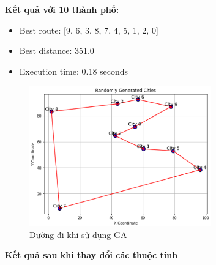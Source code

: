 \documentclass[14pt]{article}
\begin{document}
	\newpage
	\textbf{Kết quả với 10 thành phố:}
	\begin{itemize}
	 	\item Best route: [9, 6, 3, 8, 7, 4, 5, 1, 2, 0]
	 	\item Best distance: 351.0
	 	\item Execution time: 0.18 seconds
	\end{itemize}
	\begin{figure}[htbp]
		\centering
		\includegraphics[width=0.7\textwidth]{./Image/GA 10 city.png}
		\caption{Dường đi khi sử dụng GA}
		\label{fig:mylabel}
	\end{figure}
	\newpage
	\textbf{Kết quả sau khi thay đổi các thuộc tính}
\end{document}
